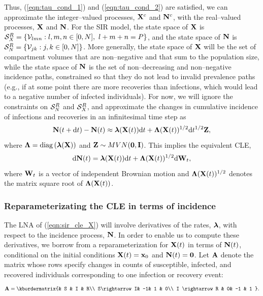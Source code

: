 Thus, (\ref{eqn:tau_cond_1}) and (\ref{eqn:tau_cond_2}) are satisfied, we can approximate the integer--valued processes, $ \mathbf{X}^c $ and $ \mathbf{N}^c $, with the real--valued processes, $ \mathbf{X} $ and $ \mathbf{N} $. For the SIR model, the state space of $ \mathbf{X} $ is $ \mcS_X^R = \lbrace \mcV_{lmn}:l,m,n \in [0,N],\ l+m+n=P\rbrace $, and the state space  of $ \mathbf{N} $ is $ \mathcal{S}_N^R = \lbrace \mathcal{V}_{jk}: j,k \in [0,N] \rbrace $. More generally, the state space of $ \mathbf{X} $ will be the set of compartment volumes that are non--negative and that sum to the population size, while the state space of $ \mathbf{N} $ is the set of non--decreasing and non--negative incidence paths, constrained so that they do not lead to invalid prevalence paths (e.g., if at some point there are more recoveries than infections, which would lead to a negative number of infected individuals). For now, we will ignore the constraints on $ \mathcal{S}_N^R $ and $ \mathcal{S}_X^R $, and approximate the changes in cumulative incidence of infections and recoveries in an infinitesimal time step as 
\begin{equation}
\mathbf{N}(t+\mathrm{d} t) - \mathbf{N}(t) \approx \boldsymbol{\lambda}(\mathbf{X}(t))\mathrm{d} t + \boldsymbol{\Lambda}(\mathbf{X}(t))^{1/2}\mathrm{d} t^{1/2}\mathbf{Z},
\end{equation}
where $ \boldsymbol{\Lambda} = \mathrm{diag}\left (\boldsymbol{\lambda}(\mathbf{X}) \right )$ and $ \mathbf{Z}\sim MVN(\boldsymbol{0},\mathbf{I}) $. This implies the equivalent CLE,
\begin{equation}
\label{eqn:sir_cle_X}
\mathrm{d} \mathbf{N}(t) = \boldsymbol{\lambda}(\mathbf{X}(t))\mathrm{d} t + \boldsymbol{\Lambda}(\mathbf{X}(t))^{1/2}\mathrm{d}\mathbf{W}_t, 
\end{equation}
where $ \mathbf{W}_t $ is a vector of independent Brownian motion and $ \boldsymbol{\Lambda}(\mathbf{X}(t))^{1/2} $ denotes the matrix square root of $ \boldsymbol{\Lambda}(\mathbf{X}(t)) $. 

\subsubsection{Reparameterizating the CLE in terms of incidence}
\label{subsubsec:cle_repar}
The LNA of (\ref{eqn:sir_cle_X}) will involve derivatives of the rates, $ \boldsymbol{\lambda} $, with respect to the incidence process, $ \mathbf{N} $. In order to enable us to compute these derivatives, we borrow from \cite{breto2009time,ho2016direct} a reparameterization for $ \mathbf{X} (t)$ in terms of $ \mathbf{N}(t) $, conditional on the initial conditions $ \mathbf{X}(t) = \mathbf{x}_0 $ and $ \mathbf{N}(t) = \boldsymbol{0} $. Let $ \mathbf{A} $ denote the matrix whose rows specify changes in counts of susceptible, infected, and recovered individuals corresponding to one infection or recovery event:
\begin{equation}
\label{eqn:sir_stoich}
\bA = \kbordermatrix{& S & I &  R\\
	S\rightarrow I& -1& 1 & 0\\
	I \rightarrow R & 0& -1 & 1
}.
\end{equation}


